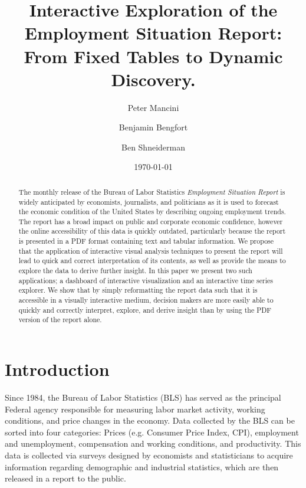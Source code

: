 \documentclass[11pt,letterpaper]{article}
\begin{document}
\title{Interactive Exploration of the Employment Situation Report: From Fixed Tables to Dynamic Discovery.}

\author[1]{Peter Mancini}
\author[2]{Benjamin Bengfort}
\author[2]{Ben Shneiderman}


\date{\today}

\maketitle

\begin{abstract}
The monthly release of the Bureau of Labor Statistics \textit{Employment Situation Report} is widely anticipated by economists, journalists, and politicians as it is used to forecast the economic condition of the United States by describing ongoing employment trends. The report has a broad impact on public and corporate economic confidence, however the online accessibility of this data is quickly outdated, particularly because the report is presented in a PDF format containing text and tabular information. We propose that the application of interactive visual analysis techniques to present the report will lead to quick and correct interpretation of its contents, as well as provide the means to explore the data to derive further insight. In this paper we present two such applications; a dashboard of interactive visualization and an interactive time series explorer. We show that by simply reformatting the report data such that it is accessible in a visually interactive medium, decision makers are more easily able to quickly and correctly interpret, explore, and derive insight than by using the PDF version of the report alone. 
\end{abstract}

\section{Introduction}

Since 1984, the Bureau of Labor Statistics (BLS) has served as the principal Federal agency responsible for measuring labor market activity, working conditions, and price changes in the economy. Data collected by the BLS can be sorted into four categories: Prices (e.g. Consumer Price Index, CPI), employment and unemployment, compensation and working conditions, and productivity. This data is collected via surveys designed by economists and statisticians to acquire information regarding demographic and industrial statistics, which are then released in a report to the public.
\end{document}
